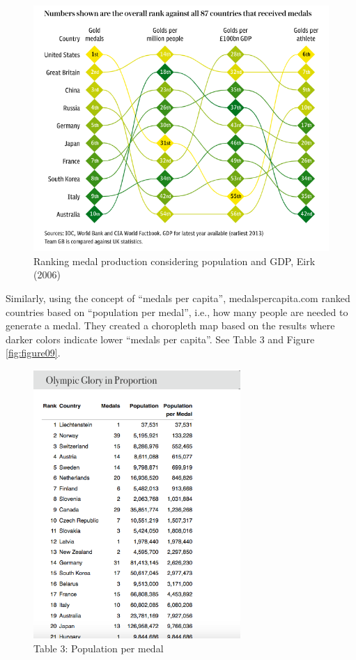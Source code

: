\documentclass[
]{article}
\begin{document}
\begin{figure}

{\centering \includegraphics[width=0.85\linewidth]{static/pics/3-4} 

}

\caption{Ranking medal production considering population and GDP, Eirk (2006)}\label{fig:figure08}
\end{figure}

Similarly, using the concept of ``medals per capita'', medalspercapita.com ranked countries based on ``population per medal'', i.e., how many people are needed to generate a medal. They created a choropleth map based on the results where darker colors indicate lower ``medals per capita''. See Table 3 and Figure \ref{fig:figure09}.

\begin{figure}
\centering
\includegraphics[width=0.7\textwidth,height=\textheight]{static/pics/3-5.png}
\caption{Table 3: Population per medal}
\end{figure}
\end{document}

